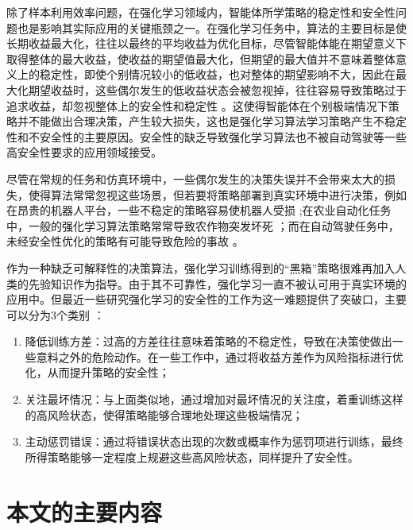 除了样本利用效率问题，在强化学习领域内，智能体所学策略的稳定性和安全性问题也是影响其实际应用的关键瓶颈之一\cite{junges2016safety}。在强化学习任务中，算法的主要目标是使长期收益最大化，往往以最终的平均收益为优化目标，尽管智能体能在期望意义下取得整体的最大收益，使收益的期望值最大化，但期望的最大值并不意味着整体意义上的稳定性，即使个别情况较小的低收益，也对整体的期望影响不大，因此在最大化期望收益时，这些偶尔发生的低收益状态会被忽视掉，往往容易导致策略过于追求收益，却忽视整体上的安全性和稳定性 \cite{garcia2015comprehensive,xiong2016combining}。这使得智能体在个别极端情况下策略并不能做出合理决策，产生较大损失，这也是强化学习算法学习策略产生不稳定性和不安全性的主要原因。安全性的缺乏导致强化学习算法也不被自动驾驶等一些高安全性要求的应用领域接受\cite{ling2015application,cheng2019end,zhang2020cautious}。

尽管在常规的任务和仿真环境中，一些偶尔发生的决策失误并不会带来太大的损失，使得算法常常忽视这些场景，但若要将策略部署到真实环境中进行决策，例如在昂贵的机器人平台，一些不稳定的策略容易使机器人受损 \cite{kormushev2010robot};在农业自动化任务中，一般的强化学习算法策略常常导致农作物突发坏死 \cite{bu2019smart}；而在自动驾驶任务中，未经安全性优化的策略有可能导致危险的事故 \cite{sallab2017deep,ferdowsi2018robust}。

作为一种缺乏可解释性的决策算法，强化学习训练得到的“黑箱”策略很难再加入人类的先验知识作为指导\cite{mousavi2020black,wei2021non}。由于其不可靠性，强化学习一直不被认可用于真实环境的应用中\cite{berkenkamp2017safe,jin2020stability}。但最近一些研究强化学习的安全性的工作为这一难题提供了突破口，主要可以分为3个类别 \cite{munos2016safe}：

\begin{enumerate}[1）]
    \item 降低训练方差：过高的方差往往意味着策略的不稳定性，导致在决策使做出一些意料之外的危险动作。在一些工作中，通过将收益方差作为风险指标进行优化，从而提升策略的安全性；
    \item 关注最坏情况：与上面类似地，通过增加对最坏情况的关注度，着重训练这样的高风险状态，使得策略能够合理地处理这些极端情况；
    \item 主动惩罚错误：通过将错误状态出现的次数或概率作为惩罚项进行训练，最终所得策略能够一定程度上规避这些高风险状态，同样提升了安全性。
\end{enumerate}

\section{本文的主要内容}

